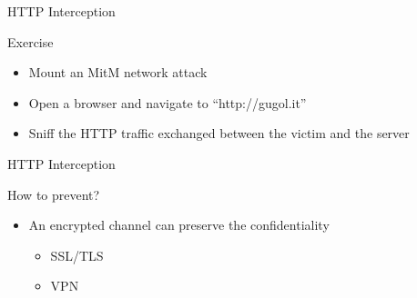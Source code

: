\documentclass{beamer}
\begin{document}
\begin{frame}{HTTP Interception}
  \begin{block}{Exercise}
    \begin{itemize}
      \item Mount an MitM network attack
      \item Open a browser and navigate to ``http://gugol.it''
      \item Sniff the HTTP traffic exchanged between the victim and the server
    \end{itemize}
  \end{block}
\end{frame}

\begin{frame}{HTTP Interception}
  \begin{block}{How to prevent?}
  \pause
  \begin{itemize}
    \item An encrypted channel can preserve the confidentiality
    \begin{itemize}
      \item SSL/TLS
      \item VPN
    \end{itemize}
  \end{itemize}
  \end{block}
\end{frame}
\end{document}
